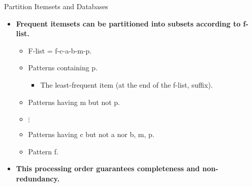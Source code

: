 \begin{frame}{Partition Itemsets and Databases}
	\begin{itemize}
		\item \textbf{Frequent itemsets can be partitioned into subsets 
		according to f-list.}
		\begin{itemize}
			\item F-list = f-c-a-b-m-p.
			\item Patterns containing p.
			\begin{itemize}
				\item The least-frequent item (at the end of the f-list, 
				suffix).
			\end{itemize}
			\item Patterns having m but not p.
			\item $\vdots$
			\item Patterns having c but not a nor b, m, p.
			\item Pattern f.
		\end{itemize}
		\item \textbf{This processing order guarantees completeness and 
		non-redundancy.}
	\end{itemize}
\end{frame}

